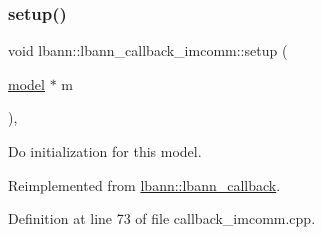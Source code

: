 \subsubsection{\texorpdfstring{setup()}{setup()}}
{\footnotesize\ttfamily void lbann\+::lbann\+\_\+callback\+\_\+imcomm\+::setup (\begin{DoxyParamCaption}\item[{\hyperlink{classlbann_1_1model}{model} $\ast$}]{m }\end{DoxyParamCaption})\hspace{0.3cm}{\ttfamily [override]}, {\ttfamily [virtual]}}

Do initialization for this model. 

Reimplemented from \hyperlink{classlbann_1_1lbann__callback_aab5086e27d9bb0a7c7ee8ffc1bc58671}{lbann\+::lbann\+\_\+callback}.



Definition at line 73 of file callback\+\_\+imcomm.\+cpp.


